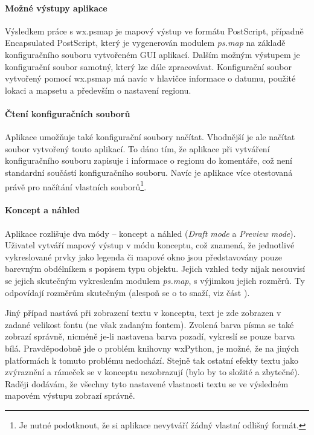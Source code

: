 \documentclass[a4paper,12pt,draft]{article}
\newcommand{\modul}[1]{\emph{#1}}
\begin{document}
\paragraph*{Možné výstupy aplikace}
Výsledkem práce s wx.psmap je mapový výstup ve formátu PostScript, případně Encapsulated PostScript, který je vygenerován modulem \modul{ps.map} na základě konfiguračního souboru vytvořeném GUI aplikací. Dalším možným výstupem je konfigurační soubor samotný, který lze dále zpracovávat. Konfigurační soubor vytvořený pomocí wx.psmap má navíc v hlavičce informace o datumu, použité lokaci a mapsetu a především o nastavení regionu.

\paragraph*{Čtení konfiguračních souborů}
Aplikace umožňuje také konfigurační soubory načítat. Vhodnější je ale načítat soubor vytvořený touto aplikací. To dáno tím, že aplikace při vytváření konfiguračního souboru zapisuje i informace o regionu do komentáře, což není standardní součástí konfiguračního souboru. Navíc je aplikace více otestovaná právě pro načítání vlastních souborů\footnote{Je nutné podotknout, že si aplikace nevytváří žádný vlastní odlišný formát.}. 

\paragraph*{Koncept a náhled}
Aplikace rozlišuje dva módy -- koncept a náhled (\emph{Draft mode} a \emph{Preview mode}). 
Uživatel vytváří mapový výstup v módu konceptu, což znamená, že jednotlivé vykreslované prvky jako legenda či mapové okno jsou představovány pouze barevným obdélníkem s popisem typu objektu. Jejich vzhled tedy nijak nesouvisí se jejich skutečným vykreslením modulem \modul{ps.map}, s výjimkou jejich rozměrů. Ty odpovídají rozměrům skutečným (alespoň se o to snaží, viz část ). 

Jiný případ nastává při zobrazení textu v konceptu, text je zde zobrazen v zadané velikost fontu (ne však zadaným fontem). Zvolená barva písma se také zobrazí správně, nicméně je-li nastavena barva pozadí, vykreslí se pouze barva bílá. Pravděpodobně jde o problém knihovny wxPython, je možné, že na jiných platformách k tomuto problému nedochází. Stejně tak ostatní efekty textu jako zvýraznění a rámeček se v konceptu nezobrazují (bylo by to složité a zbytečné). Raději dodávám, že všechny tyto nastavené vlastnosti textu se ve výsledném mapovém výstupu zobrazí správně.
\end{document}
